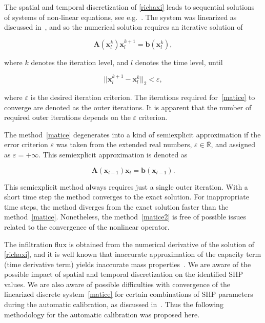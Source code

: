 \documentclass[review]{elsarticle}
\newenvironment{lineq}
    {\begin{linenomath*}
    \begin{equation}
    }
    { 
    \end{equation} 
    \end{linenomath*}
    }
\renewcommand{\vec}{\mathbf}
\begin{document}
 
 The spatial and temporal discretization of \eqref{richaxi} leads to sequential solutions of systems of non-linear equations, see e.g.~\citep{mojecomp}. The system was linearized as discussed in~\citet{mojeacta, mojeamc}, and so the numerical solution requires an iterative solution of 
\begin{lineq}
\label{matice}
\mathbf{A}(\vec{x}_l^k) \vec{x}_l^{k+1} = \vec{b}(\vec{x}_l^k),
\end{lineq}
where $k$ denotes the iteration level, and $l$ denotes the time level, until \begin{lineq} \label{picard} ||\vec{x}_l^{k+1} - \vec{x}_l^k||_2 < \varepsilon , \end{lineq} where $\varepsilon$ is the desired iteration criterion. The iterations required for~\eqref{matice} to converge are denoted as the outer iterations. It is apparent that the number of required outer iterations depends on the $\varepsilon$ criterion. 


The method~\eqref{matice} degenerates into a kind of semiexplicit approximation if the error criterion $\varepsilon$ was taken from the extended real numbers, $\varepsilon \in {\overline {\mathbb {R} }}$, and assigned as $\varepsilon = + \infty$. This semiexplicit approximation is denoted as
\begin{lineq}
\label{matice2}
\mathbf{A}(\vec{x}_{l-1}) \vec{x}_l = \vec{b}(\vec{x}_{l-1}).
\end{lineq}
 This semiexplicit method always requires just a single outer iteration. With a short time step the method converges to the exact solution. For inappropriate time steps, the method diverges from the exact solution faster than the method~\eqref{matice}. Nonetheless, the method~\eqref{matice2} is free of possible issues related to the convergence of the nonlinear operator.

The infiltration flux is obtained from the numerical derivative of the solution of \eqref{richaxi},  and  it is well known that inaccurate approximation of the capacity term (time derivative term) yields inaccurate mass properties~\citep{celia}. We are aware of the possible impact of spatial and temporal discretization on the identified SHP values. We are also aware of possible difficulties with convergence of the linearized discrete system~\eqref{matice} for certain combinations of SHP parameters during the automatic calibration, as discussed in~\cite{beven2003-uncertain}.
Thus the following methodology for the automatic calibration was proposed here.
\end{document}
